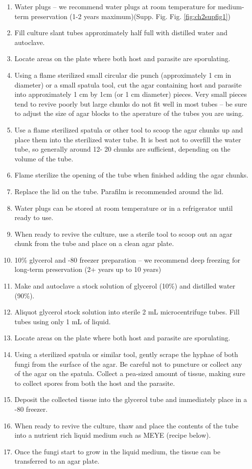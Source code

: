 \documentclass[]{book}
\begin{document}
\begin{enumerate}
\def\labelenumi{\arabic{enumi}.}
\item
  {Water plugs -- we recommend water plugs at room temperature for medium-term preservation (1-2 years maximum)}(Supp. Fig. Fig. \ref{fig:ch2supfig1})
\item
  Fill culture slant tubes approximately half full with distilled water and autoclave.
\item
  Locate areas on the plate where both host and parasite are sporulating.
\item
  Using a flame sterilized small circular die punch (approximately 1 cm in diameter) or a small spatula tool, cut the agar containing host and parasite into approximately 1 cm by 1cm (or 1 cm diameter) pieces. Very small pieces tend to revive poorly but large chunks do not fit well in most tubes -- be sure to adjust the size of agar blocks to the aperature of the tubes you are using.
\item
  Use a flame sterilized spatula or other tool to scoop the agar chunks up and place them into the sterilized water tube. It is best not to overfill the water tube, so generally around 12- 20 chunks are sufficient, depending on the volume of the tube.
\item
  Flame sterilize the opening of the tube when finished adding the agar chunks.
\item
  Replace the lid on the tube. Parafilm is recommended around the lid.
\item
  Water plugs can be stored at room temperature or in a refrigerator until ready to use.
\item
  When ready to revive the culture, use a sterile tool to scoop out an agar chunk from the tube and place on a clean agar plate.
\item
  {10\% glycerol and -80 freezer preparation -- we recommend deep freezing for long-term preservation (2+ years up to 10 years)}
\item
  Make and autoclave a stock solution of glycerol (10\%) and distilled water (90\%).
\item
  Aliquot glycerol stock solution into sterile 2 mL microcentrifuge tubes. Fill tubes using only 1 mL of liquid.
\item
  Locate areas on the plate where both host and parasite are sporulating.
\item
  Using a sterilized spatula or similar tool, gently scrape the hyphae of both fungi from the surface of the agar. Be careful not to puncture or collect any of the agar on the spatula. Collect a pea-sized amount of tissue, making sure to collect spores from both the host and the parasite.
\item
  Deposit the collected tissue into the glycerol tube and immediately place in a -80 freezer.
\item
  When ready to revive the culture, thaw and place the contents of the tube into a nutrient rich liquid medium such as MEYE (recipe below).
\item
  Once the fungi start to grow in the liquid medium, the tissue can be transferred to an agar plate.
\end{enumerate}
\end{document}

